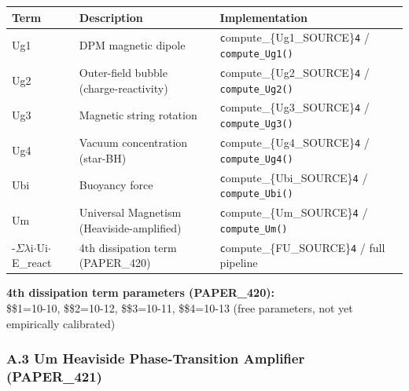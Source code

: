 \documentclass[
  11pt,
]{article}
\newcounter{none} %
\begin{document}
{\def\LTcaptype{none} %
\begin{longtable}[]{@{}
  >{\raggedright\arraybackslash}p{}
  >{\raggedright\arraybackslash}p{}
  >{\raggedright\arraybackslash}p{}@{}}
\toprule\noalign{}
\begin{minipage}[b]{\linewidth}\raggedright
Term
\end{minipage} & \begin{minipage}[b]{\linewidth}\raggedright
Description
\end{minipage} & \begin{minipage}[b]{\linewidth}\raggedright
Implementation
\end{minipage} \\
\midrule\noalign{}
\endhead
\bottomrule\noalign{}
\endlastfoot
Ug1 & DPM magnetic dipole & \texttt{c}ompute\_\{Ug1\_SOURCE\}\texttt{4}
/ \texttt{compute\_Ug1()} \\
Ug2 & Outer-field bubble (charge-reactivity) &
\texttt{c}ompute\_\{Ug2\_SOURCE\}\texttt{4} / \texttt{compute\_Ug2()} \\
Ug3 & Magnetic string rotation &
\texttt{c}ompute\_\{Ug3\_SOURCE\}\texttt{4} / \texttt{compute\_Ug3()} \\
Ug4 & Vacuum concentration (star-BH) &
\texttt{c}ompute\_\{Ug4\_SOURCE\}\texttt{4} / \texttt{compute\_Ug4()} \\
Ubi & Buoyancy force & \texttt{c}ompute\_\{Ubi\_SOURCE\}\texttt{4} /
\texttt{compute\_Ubi()} \\
Um & Universal Magnetism (Heaviside-amplified) &
\texttt{c}ompute\_\{Um\_SOURCE\}\texttt{4} / \texttt{compute\_Um()} \\
-$\Sigma$$\lambda$i$\cdot$Ui$\cdot$E\_react & 4th dissipation
term (PAPER\_420) & \texttt{c}ompute\_\{FU\_SOURCE\}\texttt{4} / full
pipeline \\
\end{longtable}
}

\textbf{4th dissipation term parameters (PAPER\_420):}\\
\$\lambda\$1=10-10, \$\lambda\$2=10-12, \$\lambda\$3=10-11,
\$\lambda\$4=10-13 (free parameters, not yet empirically calibrated)

\subsubsection{A.3 Um Heaviside Phase-Transition Amplifier
(PAPER\_421)}\label{a.3-um-heaviside-phase-transition-amplifier-paper_421}
\end{document}
